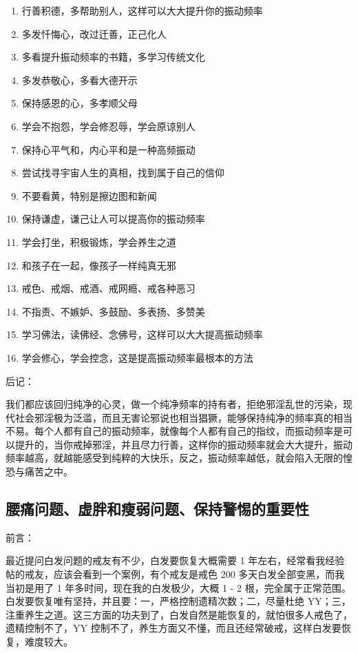 \documentclass{ctexart}
\begin{document}
\begin{enumerate}
    \item 行善积德，多帮助别人，这样可以大大提升你的振动频率
    \item 多发忏悔心，改过迁善，正己化人
    \item 多看提升振动频率的书籍，多学习传统文化
    \item 多发恭敬心，多看大德开示
    \item 保持感恩的心，多孝顺父母
    \item 学会不抱怨，学会修忍辱，学会原谅别人
    \item 保持心平气和，内心平和是一种高频振动
    \item 尝试找寻宇宙人生的真相，找到属于自己的信仰
    \item 不要看黄，特别是擦边图和新闻
    \item 保持谦虚，谦己让人可以提高你的振动频率
    \item 学会打坐，积极锻炼，学会养生之道
    \item 和孩子在一起，像孩子一样纯真无邪
    \item 戒色、戒烟、戒酒、戒网瘾、戒各种恶习
    \item 不指责、不嫉妒、多鼓励、多表扬、多赞美
    \item 学习佛法，读佛经、念佛号，这样可以大大提高振动频率
    \item 学会修心，学会控念，这是提高振动频率最根本的方法
\end{enumerate}

后记：

我们都应该回归纯净的心灵，做一个纯净频率的持有者，拒绝邪淫乱世的污染，现代社会邪淫极为泛滥，而且无害论邪说也相当猖獗，能够保持纯净的频率真的相当不易。每个人都有自己的振动频率，就像每个人都有自己的指纹，而振动频率是可以提升的，当你戒掉邪淫，并且尽力行善，这样你的振动频率就会大大提升，振动频率越高，就越能感受到纯粹的大快乐，反之，振动频率越低，就会陷入无限的惶恐与痛苦之中。

\subsection{腰痛问题、虚胖和瘦弱问题、保持警惕的重要性}

前言：

最近提问白发问题的戒友有不少，白发要恢复大概需要 1 年左右，经常看我经验帖的戒友，应该会看到一个案例，有个戒友是戒色 200 多天白发全部变黑，而我当初是用了 1 年多时间，现在我的白发极少，大概 1 - 2 根，完全属于正常范围。白发要恢复唯有坚持，并且要：一，严格控制遗精次数；二，尽量杜绝 YY；三，注重养生之道。这三方面的功夫到了，白发自然是能恢复的，就怕很多人戒色了，遗精控制不了，YY 控制不了，养生方面又不懂，而且还经常破戒，这样白发要恢复，难度较大。
\end{document}
